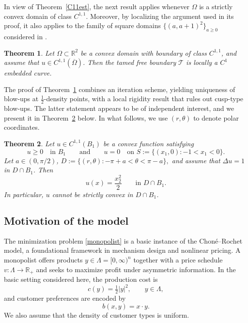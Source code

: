 \documentclass[reqno,11pt]{amsart}
\newtheorem{thm}{Theorem}[section]
\numberwithin{equation}{section}
\theoremstyle{remark}
\begin{document}
In view of Theorem~\ref{C11est}, the next result applies whenever $\Omega$ is a strictly convex domain of class $C^{1,1}$. Moreover, by localizing the argument used in its proof, it also applies to the family of square domains $\{(a,a+1)^2\}_{a\ge0}$ considered in \cite{MRZ20252}.

\begin{thm}\label{Fbregu}
Let $\Omega \subset \mathbb{R}^2$ be a convex domain with boundary of class $C^{1,1}$, and assume that $u \in C^{1,1}(\overline\Omega)$.
Then the tamed free boundary $\mathcal{T}$ is locally a $C^1$ embedded curve.
\end{thm}



The proof of Theorem~\ref{Fbregu} combines an iteration scheme, yielding uniqueness of blow-ups at
$\frac12$-density points, with a local rigidity result that rules out cusp-type blow-ups.
The latter statement appears to be of independent interest, and we present it in Theorem~\ref{Rigi} below.
In what follows, we use $(r,\theta)$ to denote polar coordinates.

\begin{thm}\label{Rigi}
Let $u\in C^{1,1}(B_1)$ be a convex function satisfying
\[
u\ge 0 \quad\text{in }B_1\qquad\text{and}
\qquad
u=0 \quad\text{on } S:=\{(x_1,0): -1<x_1<0\}.
\]
Let $a\in(0,\pi/2)$, 
$D:=\{(r,\theta): -\pi+a<\theta<\pi-a\},$
and assume that $\Delta u=1$ in $D\cap B_1$. Then
\[
u(x)=\frac{x_2^2}{2}
\qquad\text{in }D\cap B_1.
\]
In particular, $u$ cannot be strictly convex in $D\cap B_1$.
\end{thm}

\subsection{Motivation of the model}

The minimization problem \eqref{monopolist} is a basic instance of the Chon\'e--Rochet model,
a foundational framework in mechanism design and nonlinear pricing.
A monopolist offers products $y\in\Lambda=[0,\infty)^n$ together with a price schedule
$v:\Lambda\to\mathbb{R}_+$ and seeks to maximize profit under asymmetric information.
In the basic setting considered here, the production cost is
\[
c(y)=\tfrac12 |y|^2,
\qquad y\in\Lambda,
\]
and customer preferences are encoded by
\[
b(x,y)=x\cdot y.
\]
We also assume that the density of customer types is uniform.
\end{document}
